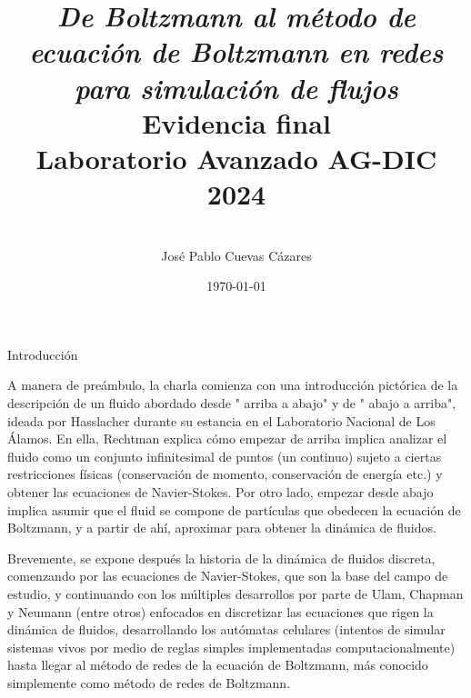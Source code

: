 \documentclass[12pt]{article}
\begin{document}
 
 
\title{\Large{\textit{De Boltzmann al método de ecuación de Boltzmann en redes para simulación de flujos}} \\
Evidencia final \\ Laboratorio Avanzado AG-DIC 2024}
\date{\today}
\author{\\ José Pablo Cuevas Cázares }
\maketitle
\tableofcontents

\begin {section} {Introducción} 

A manera de preámbulo, la charla comienza con una introducción pictórica de la descripción de un fluido abordado desde " arriba a abajo" y de " abajo a arriba", ideada por Hasslacher durante su estancia en el Laboratorio Nacional de Los Álamos. En ella, Rechtman explica cómo empezar de arriba implica analizar el fluido como un conjunto infinitesimal de puntos (un continuo) sujeto a ciertas restricciones físicas (conservación de momento, conservación de energía etc.) y obtener las ecuaciones de Navier-Stokes. Por otro lado, empezar desde abajo implica asumir que el fluid se compone de partículas que obedecen la ecuación de Boltzmann, y a partir de ahí, aproximar para obtener la dinámica de fluidos.

 Brevemente, se expone después la historia de la dinámica de fluidos discreta, comenzando por las ecuaciones de Navier-Stokes, que son la base del campo de estudio, y continuando con los múltiples desarrollos por parte de Ulam, Chapman y Neumann  (entre otros) enfocados en discretizar las ecuaciones que rigen la dinámica de fluidos, desarrollando los autómatas celulares (intentos de simular sistemas vivos por medio de reglas simples implementadas computacionalmente) hasta llegar al método de redes de la ecuación de Boltzmann, más conocido simplemente como método de redes de Boltzmann.
 
 \end {section}
\end{document}
